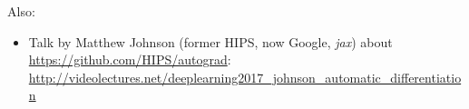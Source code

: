 \documentclass[paper=a4,11pt,headsepline]{scrartcl}
\begin{document}



Also:

\begin{itemize}
    \item Talk by Matthew Johnson (former HIPS, now Google, \textsl{jax}) about
        \url{https://github.com/HIPS/autograd}:
        \url{http://videolectures.net/deeplearning2017_johnson_automatic_differentiation}
\end{itemize}
\end{document}
